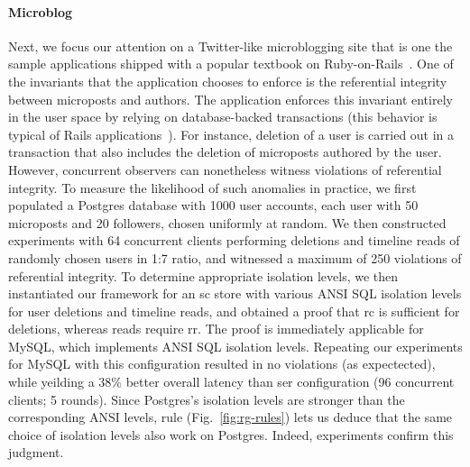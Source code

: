 \paragraph{Microblog}

Next, we focus our attention on a Twitter-like microblogging site that
is one the sample applications shipped with a popular textbook on
Ruby-on-Rails~\cite{railsbook}. One of the invariants that the
application chooses to enforce is the referential integrity between
microposts and authors. The application enforces this invariant
entirely in the user space by relying on database-backed transactions
(this behavior is typical of Rails applications~\cite{bailisferal}).
For instance, deletion of a user is carried out in a transaction that
also includes the deletion of microposts authored by the user.
However, concurrent observers can nonetheless witness violations of
referential integrity. To measure the likelihood of such anomalies in
practice, we first populated a Postgres database with 1000 user
accounts, each user with 50 microposts and 20 followers, chosen
uniformly at random. We then constructed experiments with 64
concurrent clients performing deletions and timeline reads of randomly
chosen users in 1:7 ratio, and witnessed a maximum of 250 violations
of referential integrity. To determine appropriate isolation levels,
we then instantiated our framework for an {\sc sc} store with various
ANSI SQL isolation levels for user deletions and timeline reads, and
obtained a proof that {\sc rc} is sufficient for deletions, whereas
reads require {\sc rr}. The proof is immediately applicable for MySQL,
which implements ANSI SQL isolation levels. Repeating our experiments
for MySQL with this configuration resulted in no violations (as
expectected), while yeilding a 38\% better overall latency than {\sc
ser} configuration (96 concurrent clients; 5 rounds).  Since
Postgres's isolation levels are stronger than the corresponding ANSI
levels,  rule (Fig.~\ref{fig:rg-rules}) lets us
deduce that the same choice of isolation levels also work on Postgres.
Indeed, experiments confirm this judgment.

